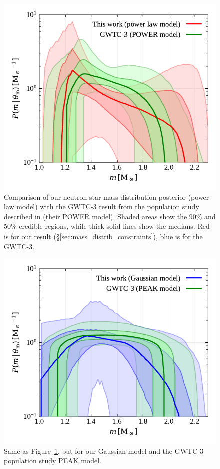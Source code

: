 \documentclass[]{aa}
\begin{document}
\begin{appendix}
\begin{figure}
 \includegraphics[width=\columnwidth]{figures/Plaw_GWTC3_comparison.pdf}
 \caption{Comparison of our neutron star mass distribution posterior (power law model) with the GWTC-3 result from the population study described in \citealt{LVC2021_GWTC3pop} (their \textsc{POWER} model). Shaded areas show the 90\% and 50\% credible regions, while thick solid lines show the medians. Red is for our result (\S\ref{sec:mass_distrib_constraints}), blue is for the GWTC-3.}
 \label{fig:Plaw_GWTC3_comparison} 
\end{figure}
%
\begin{figure}
 \includegraphics[width=\columnwidth]{figures/Gauss_GWTC3_comparison.pdf}
 \caption{Same as Figure~\ref{fig:Plaw_GWTC3_comparison}, but for our Gaussian model and the GWTC-3 population study \textsc{PEAK} model.}
 \label{fig:Gauss_GWTC3_comparison}
\end{figure}


\end{appendix}
\end{document}
